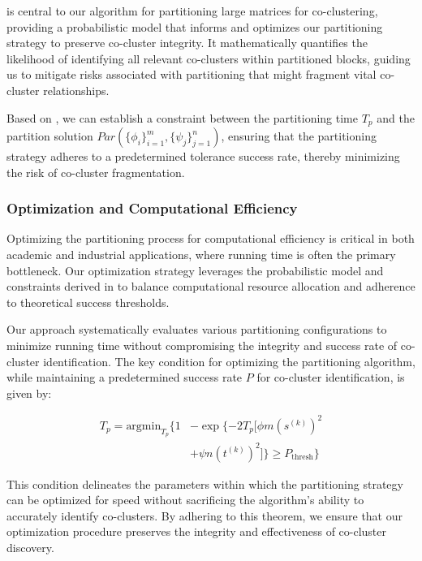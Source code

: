\documentclass[journal]{IEEEtran}
\begin{document}
 is central to our algorithm for partitioning large matrices for co-clustering, providing a probabilistic model that informs and optimizes our partitioning strategy to preserve co-cluster integrity. It mathematically quantifies the likelihood of identifying all relevant co-clusters within partitioned blocks, guiding us to mitigate risks associated with partitioning that might fragment vital co-cluster relationships.

Based on , we can establish a constraint between the partitioning time $T_p$ and the partition solution $Par(\{\phi_i\}_{i=1}^m, \{\psi_j\}_{j=1}^n)$, ensuring that the partitioning strategy adheres to a predetermined tolerance success rate, thereby minimizing the risk of co-cluster fragmentation.

\subsubsection{Optimization and Computational Efficiency}

Optimizing the partitioning process for computational efficiency is critical in both academic and industrial applications, where running time is often the primary bottleneck. Our optimization strategy leverages the probabilistic model and constraints derived in  to balance computational resource allocation and adherence to theoretical success thresholds.

Our approach systematically evaluates various partitioning configurations to minimize running time without compromising the integrity and success rate of co-cluster identification. The key condition for optimizing the partitioning algorithm, while maintaining a predetermined success rate \( P \) for co-cluster identification, is given by:

\begin{equation}
  \begin{split}
    T_p = \text{argmin}_{T_p} \{
    1 & - \exp \{ -2 T_p [\phi m (s^{(k)})^2              \\
      & + \psi n (t^{(k)})^2] \} \ge P_{\text{thresh}} \}
  \end{split}
\end{equation}

This condition delineates the parameters within which the partitioning strategy can be optimized for speed without sacrificing the algorithm's ability to accurately identify co-clusters. By adhering to this theorem, we ensure that our optimization procedure preserves the integrity and effectiveness of co-cluster discovery.
\end{document}
